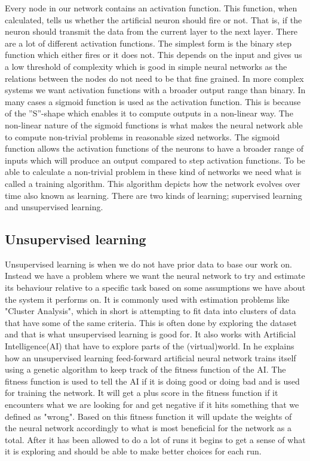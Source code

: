 Every node in our network contains an activation function. This function, when calculated, tells us whether the artificial neuron should fire or not. That is, if the neuron should transmit the data from the current layer to the next layer. There are a lot of different activation functions. The simplest form is the binary step function which either fires or it does not. This depends on the input and gives us a low threshold of complexity which is good in simple neural networks as the relations between the nodes do not need to be that fine grained. In more complex systems we want activation functions with a broader output range than binary. In many cases a sigmoid function is used as the activation function. This is because of the ''S''-shape which enables it to compute outputs in a non-linear way. The non-linear nature of the sigmoid functions is what makes the neural network able to compute non-trivial problems in reasonable sized networks. The sigmoid function allows the activation functions of the neurons to have a broader range of inputs which will produce an output compared to step activation functions. To be able to calculate a non-trivial problem in these kind of networks we need what is called a training algorithm. This algorithm depicts how the network evolves over time also known as learning. There are two kinds of learning; supervised learning and unsupervised learning.

\subsection{Unsupervised learning}
Unsupervised learning is when we do not have prior data to base our work on. Instead we have a problem where we want the neural network to try and estimate its behaviour relative to a specific task based on some assumptions we have about the system it performs on. It is commonly used with estimation problems like "Cluster Analysis", which in short is attempting to fit data into clusters of data that have some of the same criteria. This is often done by exploring the dataset and that is what unsupervised learning is good for. It also works with Artificial Intelligence(AI) that have to explore parts of the (virtual)world. In \cite{buckland2002ai} he explains how an unsupervised learning feed-forward artificial neural network trains itself using a genetic algorithm to keep track of the fitness function of the AI. The fitness function is used to tell the AI if it is doing good or doing bad and is used for training the network. It will get a plus score in the fitness function if it encounters what we are looking for and get negative if it hits something that we defined as "wrong". Based on this fitness function it will update the weights of the neural network accordingly to what is most beneficial for the network as a total. After it has been allowed to do a lot of runs it begins to get a sense of what it is exploring and should be able to make better choices for each run.

